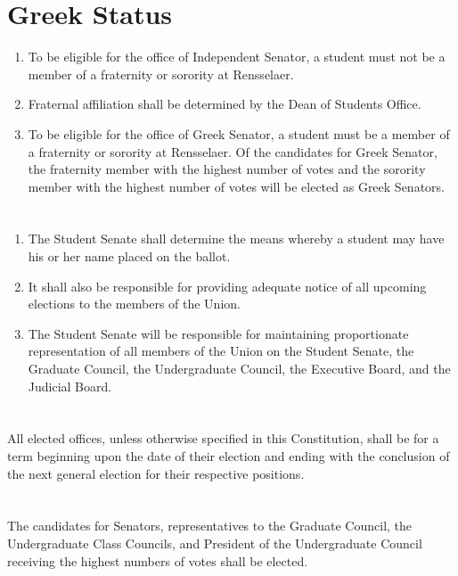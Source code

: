 \section{Greek Status}
\begin{enumerate}
\item To be eligible for the office of Independent Senator, a student must not be a member of a
fraternity or sorority at Rensselaer.
\item Fraternal affiliation shall be determined by the Dean of Students Office.
\item To be eligible for the office of Greek Senator, a student must be a member of a fraternity or
sorority at Rensselaer. Of the candidates for Greek Senator, the fraternity member with the
highest number of votes and the sorority member with the highest number of votes will be
elected as Greek Senators.
\end{enumerate}

\section{}
\begin{enumerate}
\item The Student Senate shall determine the means whereby a student may have his or her name
placed on the ballot.
\item It shall also be responsible for providing adequate notice of all upcoming elections to the
members of the Union.
\item The Student Senate will be responsible for maintaining proportionate representation of all
members of the Union on the Student Senate, the Graduate Council, the Undergraduate
Council, the Executive Board, and the Judicial Board.
\end{enumerate}

\section{}
All elected offices, unless otherwise specified in this Constitution, shall be for a term beginning upon the date of their election and ending with the conclusion of the next general election for their respective
positions.

\section{}
The candidates for Senators, representatives to the Graduate Council, the Undergraduate Class Councils,
and President of the Undergraduate Council receiving the highest numbers of votes shall be elected.

